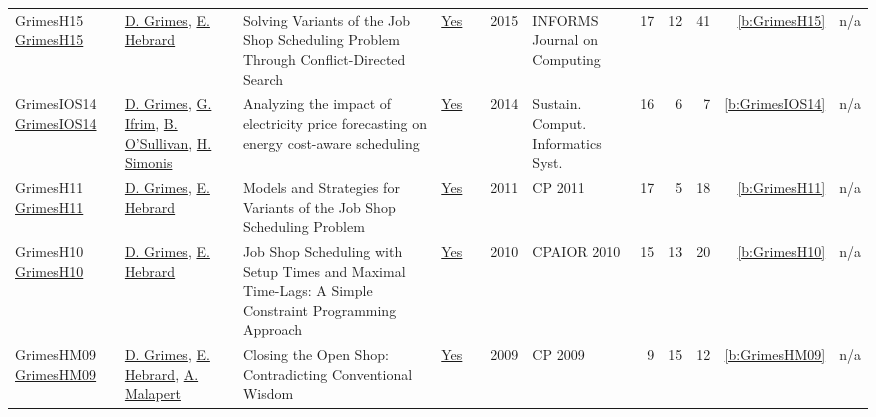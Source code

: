 {\begin{longtable}{>{\raggedright\arraybackslash}p{3cm}>{\raggedright\arraybackslash}p{6cm}>{\raggedright\arraybackslash}p{6.5cm}rrrp{2.5cm}rrrrr}
GrimesH15 \href{https://doi.org/10.1287/ijoc.2014.0625}{GrimesH15} & \hyperref[auth:a182]{D. Grimes}, \hyperref[auth:a1]{E. Hebrard} & Solving Variants of the Job Shop Scheduling Problem Through Conflict-Directed Search & \href{../works/GrimesH15.pdf}{Yes} & \cite{GrimesH15} & 2015 & INFORMS Journal on Computing & 17 & 12 & 41 & \ref{b:GrimesH15} & n/a\\
GrimesIOS14 \href{https://doi.org/10.1016/j.suscom.2014.08.009}{GrimesIOS14} & \hyperref[auth:a182]{D. Grimes}, \hyperref[auth:a183]{G. Ifrim}, \hyperref[auth:a16]{B. O'Sullivan}, \hyperref[auth:a17]{H. Simonis} & Analyzing the impact of electricity price forecasting on energy cost-aware scheduling & \href{../works/GrimesIOS14.pdf}{Yes} & \cite{GrimesIOS14} & 2014 & Sustain. Comput. Informatics Syst. & 16 & 6 & 7 & \ref{b:GrimesIOS14} & n/a\\
GrimesH11 \href{https://doi.org/10.1007/978-3-642-23786-7_28}{GrimesH11} & \hyperref[auth:a182]{D. Grimes}, \hyperref[auth:a1]{E. Hebrard} & Models and Strategies for Variants of the Job Shop Scheduling Problem & \href{../works/GrimesH11.pdf}{Yes} & \cite{GrimesH11} & 2011 & CP 2011 & 17 & 5 & 18 & \ref{b:GrimesH11} & n/a\\
GrimesH10 \href{https://doi.org/10.1007/978-3-642-13520-0_19}{GrimesH10} & \hyperref[auth:a182]{D. Grimes}, \hyperref[auth:a1]{E. Hebrard} & Job Shop Scheduling with Setup Times and Maximal Time-Lags: {A} Simple Constraint Programming Approach & \href{../works/GrimesH10.pdf}{Yes} & \cite{GrimesH10} & 2010 & CPAIOR 2010 & 15 & 13 & 20 & \ref{b:GrimesH10} & n/a\\
GrimesHM09 \href{https://doi.org/10.1007/978-3-642-04244-7_33}{GrimesHM09} & \hyperref[auth:a182]{D. Grimes}, \hyperref[auth:a1]{E. Hebrard}, \hyperref[auth:a82]{A. Malapert} & Closing the Open Shop: Contradicting Conventional Wisdom & \href{../works/GrimesHM09.pdf}{Yes} & \cite{GrimesHM09} & 2009 & CP 2009 & 9 & 15 & 12 & \ref{b:GrimesHM09} & n/a\\
\end{longtable}
}

\clearpage
